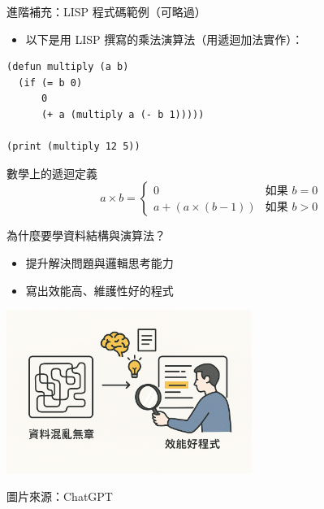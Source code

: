 \documentclass{beamer}
\begin{document}
\begin{frame}[fragile]{進階補充：LISP 程式碼範例（可略過）}
\begin{itemize}
    \item 以下是用 LISP 撰寫的乘法演算法（用遞迴加法實作）：
\end{itemize}

\vspace{0.5em}
\begin{lstlisting}[style=lispstyle]
(defun multiply (a b)
  (if (= b 0)
      0
      (+ a (multiply a (- b 1)))))

(print (multiply 12 5))
\end{lstlisting}

\vspace{1em}
\begin{block}{數學上的遞迴定義}
\[
a \times b =
\begin{cases}
0 & \text{如果 } b = 0 \\
a + (a \times (b - 1)) & \text{如果 } b > 0
\end{cases}
\]
\end{block}
\end{frame}

\begin{frame}{為什麼要學資料結構與演算法？}
\begin{itemize}
    \item 提升解決問題與邏輯思考能力
    \item 寫出效能高、維護性好的程式
\end{itemize}

\vspace{1em}
\begin{center}
    \includegraphics[width=0.6\textwidth]{images/why.png}
    
    {\tiny 圖片來源：ChatGPT}
\end{center}
\end{frame}
\end{document}

